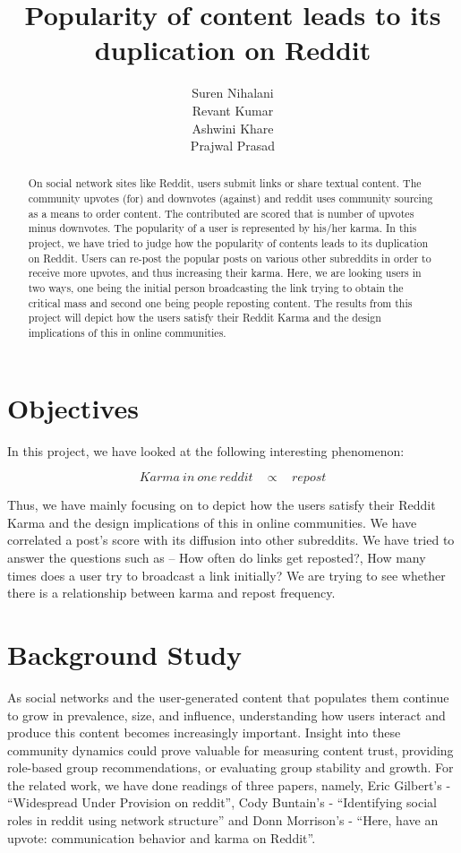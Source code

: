 \documentclass{article} %
\title{Popularity of content leads to its duplication on Reddit}
\author{
Suren Nihalani \\
\And
Revant Kumar \\
\And
Ashwini Khare \\
\And
Prajwal Prasad
}
\begin{document}
\maketitle

\begin{abstract}
On social network sites like Reddit, users submit links or share textual content. The community upvotes (for) and downvotes (against) and reddit uses community sourcing as a means to order content. The contributed are scored that is number of upvotes minus downvotes. The popularity of a user is represented by his/her karma. In this project, we have tried to judge how the popularity of contents leads to its duplication on Reddit. Users can re-post the popular posts on various other subreddits in order to receive more upvotes, and thus increasing their karma. Here, we are looking users in two ways, one being the initial person broadcasting the link trying to obtain the critical mass and second one being people reposting content. The results from this project will depict how the users satisfy their Reddit Karma and the design implications of this in online communities. 
\end{abstract}

\section{Objectives}
In this project, we have looked at the following interesting phenomenon:

\begin{equation} 
Karma\ in\ one\ reddit\ \ \ \ \propto\ \ \ \ repost  \nonumber
\end{equation}

Thus, we have mainly focusing on to depict how the users satisfy their Reddit Karma and the design implications of this in online communities. We have correlated a post's score with its diffusion into other subreddits. We have tried to answer the questions such as -- How often do links get reposted?, How many times does a user try to broadcast a link initially? We are trying to see whether there is a relationship between karma and repost frequency.


\section{Background Study}

As social networks and the user-generated content that populates them continue to grow in prevalence, size, and influence, understanding how users interact and produce this content becomes increasingly important. Insight into these community dynamics could prove valuable for measuring content trust, providing role-based group recommendations, or evaluating group stability and growth. For the related work, we have done readings of three papers, namely, Eric Gilbert's - ``Widespread Under Provision on reddit'', Cody Buntain's - ``Identifying social roles in reddit using network structure'' and Donn Morrison's - ``Here, have an upvote: communication behavior and karma on Reddit''.
\end{document}
